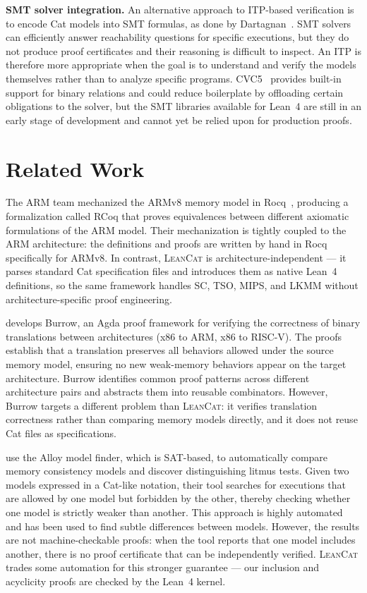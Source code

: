 \textbf{SMT solver integration.} An alternative approach to ITP-based verification is to encode Cat models into SMT formulas, as done by Dartagnan~\citep{10.1145/3776687}. SMT solvers can efficiently answer reachability questions for specific executions, but they do not produce proof certificates and their reasoning is difficult to inspect. An ITP is therefore more appropriate when the goal is to understand and verify the models themselves rather than to analyze specific programs. CVC5~\citep{barbosa2022cvc5} provides built-in support for binary relations and could reduce boilerplate by offloading certain obligations to the solver, but the SMT libraries available for Lean~4 are still in an early stage of development and cannot yet be relied upon for production proofs.


\section{Related Work}
\label{sec:related-work}

The ARM team mechanized the ARMv8 memory model in Rocq~\citep{10.1145/3458926ArmedCat}, producing a formalization called RCoq that proves equivalences between different axiomatic formulations of the ARM model. Their mechanization is tightly coupled to the ARM architecture: the definitions and proofs are written by hand in Rocq specifically for ARMv8. In contrast, \textsc{LeanCat} is architecture-independent --- it parses standard Cat specification files and introduces them as native Lean~4 definitions, so the same framework handles SC, TSO, MIPS, and LKMM without architecture-specific proof engineering.

\citet{DennisPhdThesis} develops Burrow, an Agda proof framework for verifying the correctness of binary translations between architectures (x86 to ARM, x86 to RISC-V). The proofs establish that a translation preserves all behaviors allowed under the source memory model, ensuring no new weak-memory behaviors appear on the target architecture. Burrow identifies common proof patterns across different architecture pairs and abstracts them into reusable combinators. However, Burrow targets a different problem than \textsc{LeanCat}: it verifies translation correctness rather than comparing memory models directly, and it does not reuse Cat files as specifications.

\citet{wickerson2017automatically} use the Alloy model finder, which is SAT-based, to automatically compare memory consistency models and discover distinguishing litmus tests. Given two models expressed in a Cat-like notation, their tool searches for executions that are allowed by one model but forbidden by the other, thereby checking whether one model is strictly weaker than another. This approach is highly automated and has been used to find subtle differences between models. However, the results are not machine-checkable proofs: when the tool reports that one model includes another, there is no proof certificate that can be independently verified. \textsc{LeanCat} trades some automation for this stronger guarantee --- our inclusion and acyclicity proofs are checked by the Lean~4 kernel.

